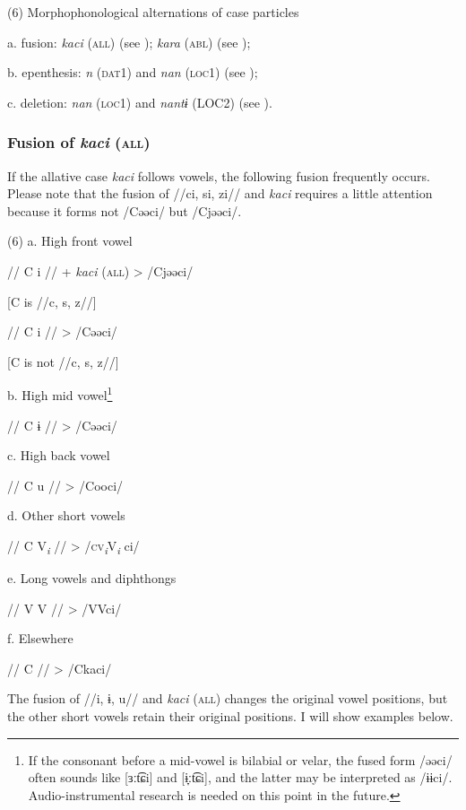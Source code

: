 (6) Morphophonological alternations of case particles

  a. fusion:         \textit{kaci} (\textsc{all}) (see ); \textit{kara} (\textsc{abl}) (see );

b. epenthesis:         \textit{n} (\textsc{dat}1) and \textit{nan} (\textsc{loc}1) (see );

c. deletion:         \textit{nan} (\textsc{loc}1) and \textit{nantɨ} (LOC2) (see ).

\subsubsection{Fusion of \textit{kaci} (\textsc{all})}
\label{bkm:Ref365151806}
If the allative case \textit{kaci} follows vowels, the following fusion frequently occurs. Please note that the fusion of //ci, si, zi// and \textit{kaci} requires a little attention because it forms not /Cəəci/ but /Cjəəci/.

(6)  a.  High front vowel

    //  C  i  //  +  \textit{kaci} (\textsc{all})  >  /Cjəəci/

    [C is //c, s, z//]

    //  C  i  //      >  /Cəəci/

    [C is not //c, s, z//]

  b.  High mid vowel\footnote{If the consonant before a mid-vowel is bilabial or velar, the fused form /əəci/ often sounds like [ɜːt͡ɕi] and [ɨ̞ːt͡ɕi], and the latter may be interpreted as /ɨɨci/. Audio-instrumental research is needed on this point in the future.}

    //  C  ɨ  //      >  /Cəəci/

  c.  High back vowel

    //  C  u  //      >  /Cooci/

  d.  Other short vowels

    //  C  V\textit{\textsubscript{i}}  //      >  /\textsc{cv}\textit{\textsubscript{i}}V\textit{\textsubscript{i} }ci/

  e.  Long vowels and diphthongs

    //  V  V  //      >  /VVci/

  f.  Elsewhere

    //  C  //        >  /Ckaci/

The fusion of //i, ɨ, u// and \textit{kaci} (\textsc{all}) changes the original vowel positions, but the other short vowels retain their original positions. I will show examples below.

